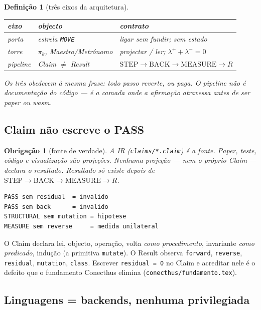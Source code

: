\documentclass[11pt,a4paper]{article}
\newcommand{\code}[1]{\texttt{\small #1}}
\newtheorem{definicao}[teorema]{Definição}
\newtheorem{obrigacao}[teorema]{Obrigação}
\begin{document}
\begin{definicao}[três eixos da arquitetura]\label{def:tres-eixos}
\begin{center}\small
\begin{tabular}{@{}lll@{}}
\toprule
eixo & objecto & contrato \\
\midrule
porta & estrela \code{MOVE} & ligar sem fundir; sem estado \\
torre & $\pi_k$, Maestro/Metrónomo & projectar / ler; $\lambda^{+}+\lambda^{-}=0$ \\
pipeline & \textsf{Claim} $\neq$ \textsf{Result} &
  $\mathrm{STEP}\to\mathrm{BACK}\to\mathrm{MEASURE}\to R$ \\
\bottomrule
\end{tabular}
\end{center}
Os três obedecem à mesma frase: \emph{todo passo reverte, ou paga.} O
pipeline não é documentação do código --- é a camada onde a afirmação
atravessa antes de ser paper ou wasm.
\end{definicao}

\subsection*{Claim não escreve o PASS}

\begin{obrigacao}[fonte de verdade]\label{ob:ir-fonte}
A IR (\code{claims/*.claim}) é a fonte. Paper, teste, código e visualização
são projeções. Nenhuma projeção --- nem o próprio Claim --- declara o
resultado. Resultado só existe depois de
$\mathrm{STEP}\to\mathrm{BACK}\to\mathrm{MEASURE}\to R$.
\begin{verbatim}
PASS sem residual  = invalido
PASS sem back      = invalido
STRUCTURAL sem mutation = hipotese
MEASURE sem reverse     = medida unilateral
\end{verbatim}
\end{obrigacao}

\noindent O \textsf{Claim} declara lei, objecto, operação, volta
\emph{como procedimento}, invariante \emph{como predicado}, indução
(a primitiva \code{mutate}). O
\textsf{Result} observa \code{forward}, \code{reverse}, \code{residual},
\code{mutation}, \code{class}. Escrever \code{residual = 0} no Claim e
acreditar nele é o defeito que o fundamento Conecthus elimina
(\code{conecthus/fundamento.tex}).

\subsection*{Linguagens = backends, nenhuma privilegiada}
\end{document}
